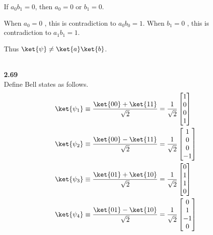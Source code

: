 \documentclass[10pt]{book}
\newcommand{\Textbf}[1]{\hspace{3mm}\\ \textbf{#1}\\}
\begin{document}
	If $a_0 b_1 = 0$, then $a_0 = 0$ or $b_1 = 0$.
	
	When $a_0 = 0$ , this is contradiction to $a_0 b_0 = 1$.
	When $b_1 = 0$ , this is contradiction to $a_1 b_1 = 1$.
	
	Thus $\ket{\psi} \neq \ket{a} \ket{b}$.
	
	
	\Textbf{2.69}
	Define Bell states as follows.
	\begin{equation}
\begin{aligned}
		\ket{\psi_1} &\equiv \frac{\ket{00} + \ket{11}}{\sqrt{2}} = \frac{1}{\sqrt{2}} \begin{bmatrix}
			1 \\
			0 \\
			0 \\
			1
		\end{bmatrix} \\
		\ket{\psi_2} &\equiv \frac{\ket{00} - \ket{11}}{\sqrt{2}} = \frac{1}{\sqrt{2}} \begin{bmatrix}
			1 \\
			0 \\
			0 \\
			-1
		\end{bmatrix} \\
		\ket{\psi_3} &\equiv \frac{\ket{01} + \ket{10}}{\sqrt{2}} = \frac{1}{\sqrt{2}} \begin{bmatrix}
			0 \\
			1 \\
			1 \\
			0
		\end{bmatrix} \\
		\ket{\psi_4} &\equiv \frac{\ket{01} - \ket{10}}{\sqrt{2}} = \frac{1}{\sqrt{2}} \begin{bmatrix}
			0 \\
			1 \\
			-1 \\
			0
		\end{bmatrix} \\
	\end{aligned}
\end{equation}
	
\end{document}
